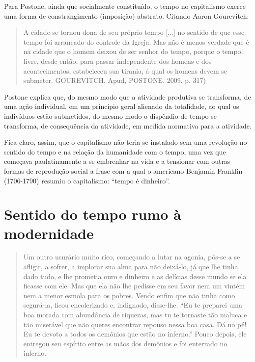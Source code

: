 Para Postone, ainda que socialmente constituído, o tempo no capitalismo
exerce uma forma de constrangimento (imposição) abstrato. Citando Aaron
Gourevitch:

\begin{quote}
A cidade se tornou dona de seu próprio tempo {[}...{]} no sentido de que
esse tempo foi arrancado do controle da Igreja. Mas não é menos verdade
que é na cidade que o homem deixou de ser senhor do tempo, porque o
tempo, livre, desde então, para passar independente dos homens e dos
acontecimentos, estabeleceu sua tirania, à qual os homens devem se
submeter. GOUREVITCH, Apud, POSTONE, 2009, p. 317)
\end{quote}

Postone explica que, do mesmo modo que a atividade produtiva se
transforma, de uma ação individual, em um princípio geral alienado da
totalidade, ao qual os indivíduos estão submetidos, do mesmo modo o
dispêndio de tempo se transforma, de consequência da atividade, em
medida normativa para a atividade.

Fica claro, assim, que o capitalismo não teria se instalado sem uma
revolução no sentido do tempo e na relação da humanidade com o tempo,
uma vez que começava paulatinamente a se embrenhar na vida e a tensionar
com outras formas de reprodução social a frase com a qual o americano
Benjamin Franklin (1706-1790) resumiu o capitalismo: ``tempo é
dinheiro''.

\section{Sentido do tempo rumo à modernidade}

\begin{quote}
Um outro usurário muito rico, começando a lutar na agonia, pôs-se a se
afligir, a sofrer, a implorar sua alma para não deixá-lo, já que lhe
tinha dado tudo, e lhe prometia ouro e dinheiro e as delícias desse
mundo se ela ficasse com ele. Mas que ela não lhe pedisse em seu favor
nem um vintém nem a menor esmola para os pobres. Vendo enfim que não
tinha como segurá-la, ficou encolerizado e, indignado, disse-lhe: ``Eu
te preparei uma boa morada com abundância de riquezas, mas tu te
tornaste tão maluca e tão miserável que não queres encontrar repouso
nessa boa casa. Dá no pé! Eu te devoto a todos os demônios que estão no
inferno.'' Pouco depois, ele entregou seu espírito entre as mãos dos
demônios e foi enterrado no inferno.
\end{quote}

